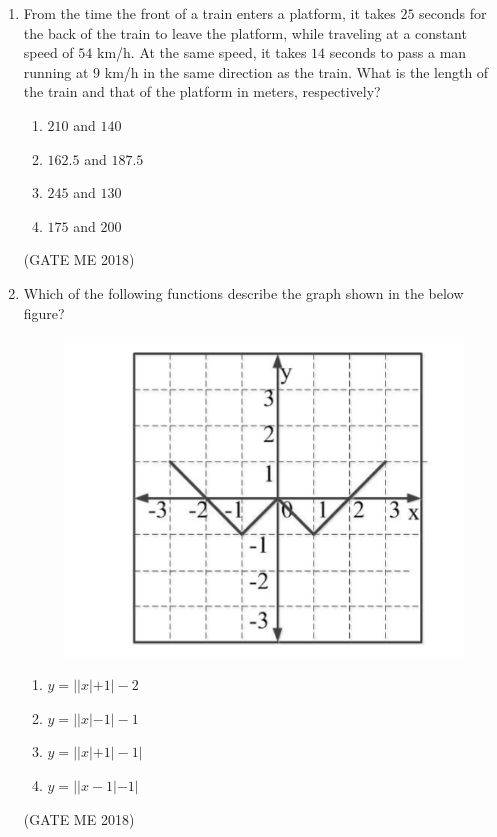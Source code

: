 \documentclass[journal]{IEEEtran}
\numberwithin{equation}{enumi}
\numberwithin{figure}{enumi}
\begin{document}
\begin{enumerate}
\begin{multicols}{2}
\begin{enumerate}
    \item $a$ and $b$ are both odd
    \item $a$ and $b$ are both even
    \item $a$ is even and $b$ is odd
    \item $a$ is odd and $b$ is even
\end{enumerate}
\end{multicols}
 \hfill{(GATE ME 2018)}
\bigskip
\item From the time the front of a train enters a platform, it takes $25$ seconds for the back of the train to leave the platform, while traveling at a constant speed of $54$ km/h. At the same speed, it takes $14$ seconds to pass a man running at $9$ km/h in the same direction as the train. What is the length of the train and that of the platform in meters, respectively?
\begin{multicols}{2}
\begin{enumerate}
    \item $210$ and $140$
    \item $162.5$ and $187.5$
    \item $245$ and $130$
    \item $175$ and $200$
\end{enumerate}
\end{multicols}
 \hfill{(GATE ME 2018)}
\item Which of the following functions describe the graph shown in the below figure?
  \begin{figure}[H]
    \centering
    \includegraphics[width = 0.6\columnwidth]{figs/fig3.1.png}
    \caption*{}
    \label{fig:Q9}
\end{figure}
\begin{multicols}{2}
\begin{enumerate}
    \item $y = ||x|+1|-2$ 
    \item $y = ||x|-1|-1$
    \item $y = ||x|+1|-1|$
    \item $y = ||x-1|-1|$
\end{enumerate}
\end{multicols}
 \hfill{(GATE ME 2018)}


\end{enumerate}
\end{document}
